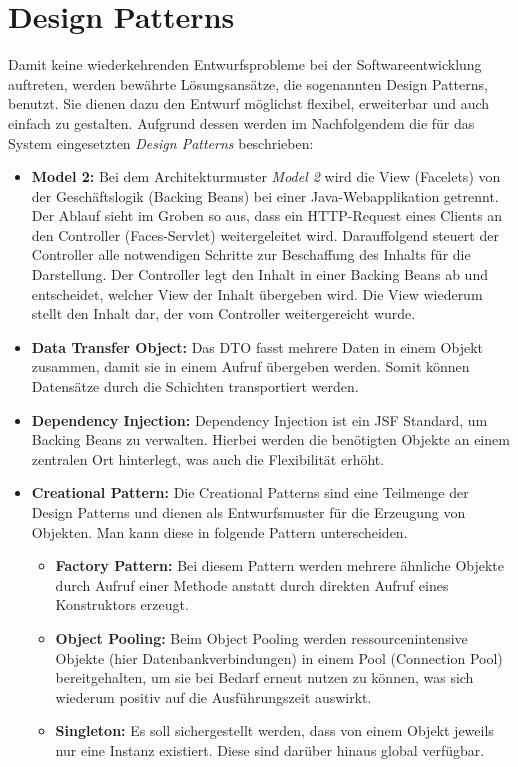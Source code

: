 \section{Design Patterns}
Damit keine wiederkehrenden Entwurfsprobleme bei der Softwareentwicklung auftreten, werden bewährte Lösungsansätze, die sogenannten \glqq Design Patterns\grqq{}, benutzt. Sie dienen dazu den Entwurf möglichst flexibel, erweiterbar und auch einfach zu gestalten. Aufgrund dessen werden im Nachfolgendem die für das System eingesetzten \textit{Design Patterns} beschrieben:
	\begin{itemize}
		\item \textbf{Model 2:} Bei dem Architekturmuster \textit{Model 2} wird die View (Facelets) von der Geschäftslogik (Backing Beans) bei einer Java-Webapplikation getrennt. Der Ablauf sieht im Groben so aus, dass ein HTTP-Request eines Clients an den Controller (Faces-Servlet) weitergeleitet wird. Darauffolgend \glqq steuert\grqq{} der Controller alle notwendigen Schritte zur Beschaffung des Inhalts für die Darstellung. Der Controller legt den Inhalt in einer Backing Beans ab und entscheidet, welcher View der Inhalt übergeben wird. Die View wiederum stellt den Inhalt dar, der vom Controller weitergereicht wurde.
		\item \textbf{Data Transfer Object:} Das DTO fasst mehrere Daten in einem Objekt zusammen, damit sie in einem Aufruf übergeben werden. Somit können Datensätze durch die Schichten transportiert werden.
		\item \textbf{Dependency Injection:} Dependency Injection ist ein JSF Standard, um Backing Beans zu verwalten. Hierbei werden die benötigten Objekte an einem zentralen Ort hinterlegt, was auch die Flexibilität erhöht.  
		\item \textbf{Creational Pattern:} Die Creational Patterns sind eine Teilmenge der Design Patterns und dienen als Entwurfsmuster für die Erzeugung von Objekten. Man kann diese in folgende Pattern unterscheiden.
			\begin{itemize}
				\item \textbf{Factory Pattern:} Bei diesem Pattern werden mehrere ähnliche Objekte durch Aufruf einer Methode anstatt durch direkten Aufruf eines Konstruktors erzeugt.
				\item \textbf{Object Pooling:} Beim Object Pooling werden ressourcenintensive Objekte (hier Datenbankverbindungen) in einem Pool (Connection Pool) bereitgehalten, um sie bei Bedarf erneut nutzen zu können, was sich wiederum positiv auf die Ausführungszeit auswirkt.
				\item \textbf{Singleton:} Es soll sichergestellt werden, dass von einem Objekt jeweils nur eine Instanz existiert. Diese sind darüber hinaus global verfügbar.  
			\end{itemize}
	\end{itemize}
